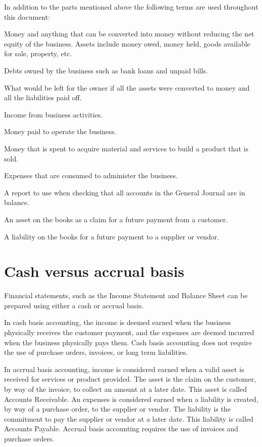 In addition to the parts mentioned above the following terms are used throughout this
document:
\begin{description}[style=nextline]
	\item [Assets] Money and anything that can be converted into money without reducing
	the net equity of the business. Assets include money owed, money held, goods
	available for sale, property, etc.
	\item [Liabilities] Debts owned by the business such as bank loans and unpaid bills.
	\item [Equity] What would be left for the owner if all the assets were converted to
	money and all the liabilities paid off.
	\item [Revenue] Income from business activities.
	\item [Expense] Money paid to operate the business.
	\item [Cost of Goods] Money that is spent to acquire material and services to build a product that is sold.
	\item [Operating Expenses] Expenses that are consumed to administer the business.
	\item [Trial Balance] A report to use when checking that all accounts in the
	General Journal are in balance.
	\item [Accounts Receivable] An asset on the books as a claim for a future payment
	from a customer.
	\item [Accounts Payable] A liability on the books for a future payment to a supplier
	or vendor.
\end{description}

\section{Cash versus accrual basis}
\label{sec-accounting-cash-vs-accrual}

Financial statements, such as the Income Statement and Balance Sheet can be prepared using
either a cash or accrual basis.

In \gls{cash basis} accounting, the income is deemed earned when the business physically
receives the customer payment, and the expenses are deemed incurred when the business
physically pays them. Cash basis accounting does not require the use of purchase orders,
invoices, or long term liabilities.

In \gls{accrual basis} accounting, income is considered earned when a valid asset is
received for services or product provided. The asset is the claim on the customer,
by way of the invoice, to collect an amount at a later date. This asset is called
Accounts Receivable. An expenses is considered earned when a liability is created,
by way of a purchase order, to the supplier or vendor. The liability is the commitment
to pay the supplier or vendor at a later date. This liability is called Accounts Payable.
Accrual basis accounting requires the use of invoices and purchase orders.

